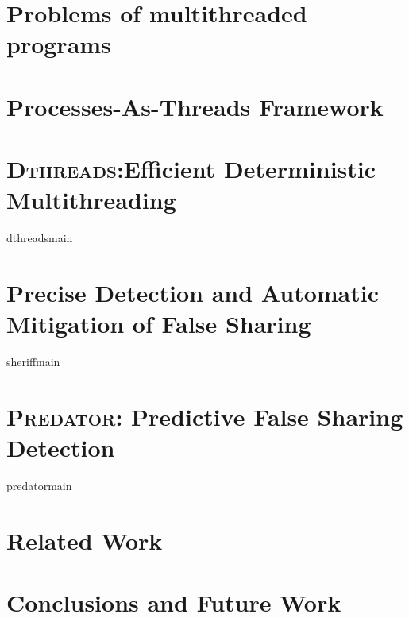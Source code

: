 \documentclass{umthesis}          %
\newcommand{\dthreads}{{\scshape Dthreads}}
\newcommand{\Predator}{\textsc{Predator}}
\newcommand{\DoubleTake}{\textsc{DoubleTake}}
\begin{document}
\tableofcontents                %
\listoffigures                  %


\mainmatter   %



\chapter{Problems of multithreaded programs}




\chapter{Processes-As-Threads Framework}


\chapter{\dthreads{}:Efficient Deterministic Multithreading}
 {dthreadsmain}

\chapter{Precise Detection and Automatic Mitigation of False Sharing}
 {sheriffmain}

\chapter{\Predator{}: Predictive False Sharing Detection}
 {predatormain}

\chapter{Related Work}


\chapter{Conclusions and Future Work}


\backmatter  %




\end{document}
